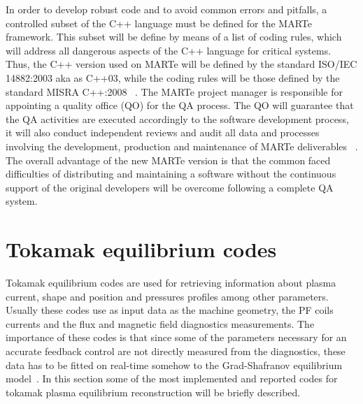 In order to develop robust code and to avoid common errors and pitfalls, a controlled subset of the C++ language must be defined for the MARTe framework. This subset will be define by means of a list of coding rules, which will address all dangerous aspects of the C++ language for critical systems. Thus, the C++ version used on MARTe will be defined by the standard ISO/IEC 14882:2003 aka as C++03, while the coding rules will be those defined by the standard MISRA C++:2008 ~\cite{MARTe2Code}. The MARTe project manager is responsible for appointing a quality office (QO) for the QA process. The QO will guarantee that the QA activities are executed accordingly to the software development process, it will also conduct independent reviews and audit all data and processes involving the development, production and maintenance of MARTe deliverables ~\cite{MARTe2QAP}. The overall advantage of the new MARTe version is that the common faced difficulties of distributing and maintaining a software without  the continuous support of the original developers will be overcome following a complete QA system.



\section{Tokamak equilibrium codes} 

Tokamak equilibrium codes are used for retrieving information about plasma current, shape and position and pressures profiles among other parameters. Usually these codes use as input data as the machine geometry, the PF coils currents and the flux and magnetic field diagnostics measurements. The importance of these codes is that since some of the parameters necessary for an accurate feedback control are not directly measured from the diagnostics,  these data has to be fitted on real-time somehow to the Grad-Shafranov equilibrium model~\cite{Shafranov1971}. In this section some of the most implemented and reported codes for tokamak plasma equilibrium reconstruction will be briefly  described.
\smallskip 


